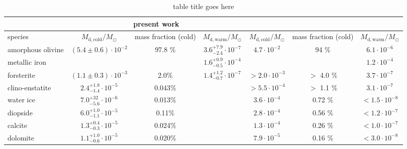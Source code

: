 \begin{table}
\caption{\label{tab:ngc6302} table title goes here}
  \begin{tabular}{l c c c c c c}
\hline %
\hline
                     & \multicolumn{3}{c}{present work}                                                       & \multicolumn{3}{c}{\citet{Kemper_02_mineral}} \\
\hline
species              & $ M_{\mathrm{d,cold}}/M_{\odot}$      & mass fraction (cold) & $ M_{\mathrm{d,warm}}/M_{\odot}$  & $ M_{\mathrm{d,cold}}/M_{\odot}$   & mass fraction (cold) & $ M_{\mathrm{d,warm}}/M_{\odot}$\\
\hline
amorphous olivine    & $(5.4\pm0.6) \cdot 10^{-2}$       & 97.8 \%                     & $3.6^{+7.9}_{-2.4} \cdot 10^{-7}$ & $4.7 \cdot 10^{-2}$           & 94 \%                & $6.1 \cdot 10^{-6}$ \\
metallic iron        &                                  &                             & $1.6^{+0.9}_{-0.5} \cdot 10^{-4}$ &                              &                      & $1.2 \cdot 10^{-4}$ \\
forsterite           & $(1.1\pm0.3) \cdot 10^{-3}$       &  2.0\%                    & $1.4^{+1.2}_{-0.7} \cdot 10^{-7}$ & $> 2.0 \cdot 10^{-3}$         & $>$ 4.0 \%           & $3.7 \cdot 10^{-7}$ \\
clino-enstatite      & $2.4^{+1.8}_{-1.4} \cdot 10^{-5}$   &  0.043\%                    &                              & $> 5.5 \cdot 10^{-4}$         & $>$ 1.1 \%           & $3.1 \cdot 10^{-7}$ \\
water ice            & $7.0^{+32}_{-5.6} \cdot 10^{-6}$    &  0.013\%                    &                              & $3.6 \cdot 10^{-4}$           & 0.72 \%              & $< 1.5 \cdot 10^{-8}$\\
diopside             & $6.0^{+1.0}_{-1.1} \cdot 10^{-5}$   &  0.11\%                    &                              & $2.8 \cdot 10^{-4}$           & 0.56 \%              & $< 1.2 \cdot 10^{-7}$\\
calcite              & $1.3^{+0.4}_{-0.3} \cdot 10^{-5}$   &  0.024\%                    &                              & $1.3 \cdot 10^{-4}$           & 0.26 \%              & $< 1.0 \cdot 10^{-7}$\\
dolomite             & $1.1^{+1.0}_{-0.6} \cdot 10^{-5}$   &  0.020\%                    &                              & $7.9 \cdot 10^{-5}$           & 0.16 \%              & $< 3.0 \cdot 10^{-8}$\\
\hline
\hline
\end{tabular}
\end{table}
